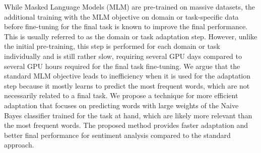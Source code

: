 While Masked Language Models (MLM) are pre-trained on massive datasets, the additional training with the MLM objective on domain or task-specific data before fine-tuning for the final task is known to improve the final performance. This is usually referred to as the domain or task adaptation step. However, unlike the initial pre-training, this step is performed for each domain or task individually and is still rather slow, requiring several GPU days compared to several GPU hours required for the final task fine-tuning. We argue that the standard MLM objective leads to inefficiency when it is used for the adaptation step because it mostly learns to predict the most frequent words, which are not necessarily related to a final task. We propose a technique for more efficient adaptation that focuses on predicting words with large weights of the Naive Bayes classifier trained for the task at hand, which are likely more relevant than the most frequent words. The proposed method provides faster adaptation and better final performance for sentiment analysis compared to the standard approach.
